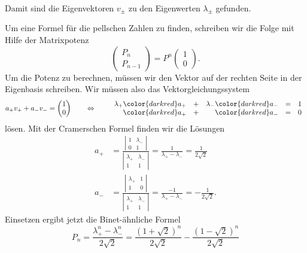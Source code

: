 \begin{loesung}
\begin{teilaufgaben}
\begin{align*}
\end{align*}
Damit sind die Eigenvektoren $v_{\pm}$ zu den Eigenwerten $\lambda_{\pm}$
gefunden.
\item
Um eine Formel für die pellschen Zahlen zu finden, schreiben wir die Folge
mit Hilfe der Matrixpotenz
\[
\begin{pmatrix}
P_{n}\\
P_{n-1}
\end{pmatrix}
=
P^n
\begin{pmatrix}1\\0\end{pmatrix}.
\]
Um die Potenz zu berechnen, müssen wir den Vektor auf der rechten Seite
in der Eigenbasis schreiben.
Wir müssen also das Vektorgleichungssystem
\[
a_+v_+ + a_-v_- = \begin{pmatrix}1\\0\end{pmatrix}
\qquad\Leftrightarrow\qquad
\begin{array}{rcrcl}
\lambda_+ {\color{darkred}a_+} &+& \lambda_- {\color{darkred}a_-} &=& 1 \\
          {\color{darkred}a_+} &+&           {\color{darkred}a_-} &=& 0
\end{array}
\]
lösen.
Mit der Cramerschen Formel finden wir die Lösungen
\begin{align*}
a_+
&=
\frac{
\left|\begin{matrix}1&\lambda_-\\0&1\end{matrix}\right|
}{
\left|\begin{matrix}\lambda_+&\lambda_-\\1&1\end{matrix}\right|
}
=
\frac{1}{\lambda_+-\lambda_-}
=
\frac{1}{2\!\sqrt{2}}
\\
a_-
&=
\frac{
\left|\begin{matrix}\lambda_+&1\\1&0\end{matrix}\right|
}{
\left|\begin{matrix}\lambda_+&\lambda_-\\1&1\end{matrix}\right|
}
=
\frac{-1}{\lambda_+-\lambda_-}
=
-\frac{1}{2\!\sqrt{2}}.
\end{align*}
Einsetzen ergibt jetzt die Binet-ähnliche Formel
\begin{equation}
P_n
=
\frac{\lambda_+^n - \lambda_-^n}{2\!\sqrt{2}}
=
\frac{(1+\!\sqrt{2})^n}{2\!\sqrt{2}}
-
\frac{(1-\!\sqrt{2})^n}{2\!\sqrt{2}}
\label{80000046:binet}

\end{equation}
\end{teilaufgaben}
\end{loesung}
